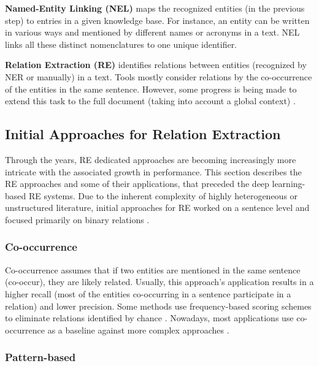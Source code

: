 \textbf{Named-Entity Linking (NEL)} maps the recognized entities (in the previous step) to entries in a given knowledge base. For instance, an entity can be written in various ways and mentioned by different names or acronyms in a text. NEL links all these distinct nomenclatures to one unique identifier. 
    
\textbf{Relation Extraction (RE)} identifies relations between entities (recognized by NER or manually) in a text. Tools mostly consider relations by the co-occurrence of the entities in the same sentence. However, some progress is being made to extend this task to the full document (taking into account a global context) \citep{singhal2016text}.


\subsection{Initial Approaches for Relation Extraction}

Through the years, RE dedicated approaches are becoming increasingly more intricate with the associated growth in performance. This section describes the RE approaches and some of their applications, that preceded the deep learning-based RE systems. Due to the inherent complexity of highly heterogeneous or unstructured literature, initial approaches for RE worked on a sentence level \citep{lamurias2017extracting} and focused primarily on binary relations \citep{zhang2017review}.


\subsubsection{Co-occurrence}

Co-occurrence assumes that if two entities are mentioned in the same sentence (co-occur), they are likely related. Usually, this approach's application results in a higher recall (most of the entities co-occurring in a sentence participate in a relation) and lower precision. 
Some methods use frequency-based scoring schemes to eliminate relations identified by chance \citep{zweigenbaum2007frontiers}. Nowadays, most applications use co-occurrence as a baseline against more complex approaches \citep{bunescu2006integrating}. 


\hypertarget{2.1.3.2}{\subsubsection{Pattern-based}}

